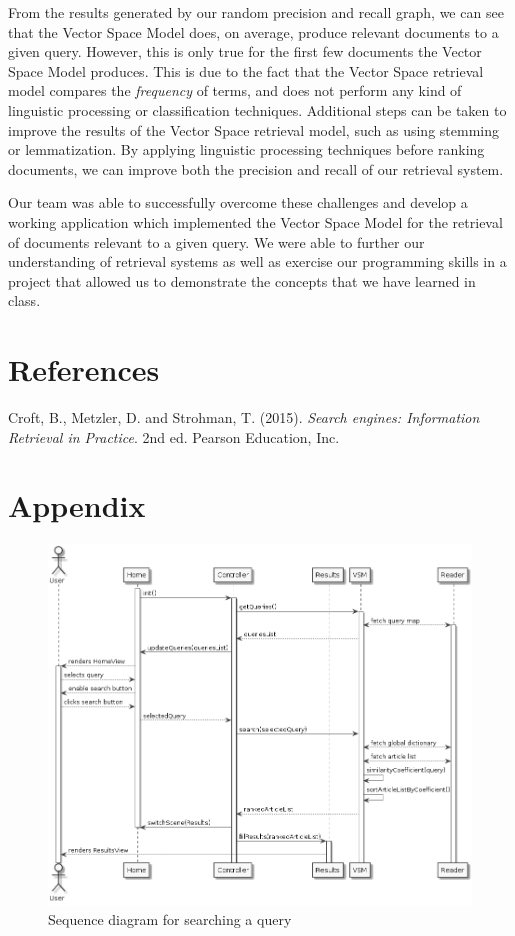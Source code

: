 \documentclass{article}
\begin{document}
From the results generated by our random precision and recall graph, we can see that the Vector Space Model does, on average, produce relevant documents to a given query. However, this is only true for the first few documents the Vector Space Model produces. This is due to the fact that the Vector Space retrieval model compares the \textit{frequency} of terms, and does not perform any kind of linguistic processing or classification techniques. Additional steps can be taken to improve the results of the Vector Space retrieval model, such as using stemming or lemmatization. By applying linguistic processing techniques before ranking documents, we can improve both the precision and recall of our retrieval system.

Our team was able to successfully overcome these challenges and develop a working application which implemented the Vector Space Model for the retrieval of documents relevant to a given query. We were able to further our understanding of retrieval systems as well as exercise our programming skills in a project that allowed us to demonstrate the concepts that we have learned in class.



\section{References}
Croft, B., Metzler, D. and Strohman, T. (2015). \textit{Search engines: Information Retrieval in Practice}. 2nd ed. Pearson Education, Inc.


\section{Appendix}

\begin{figure}[h]
	\caption{Sequence diagram for searching a query}
	\centering
	\includegraphics[scale=0.5]{searchDiagram}
\end{figure}
\end{document}
